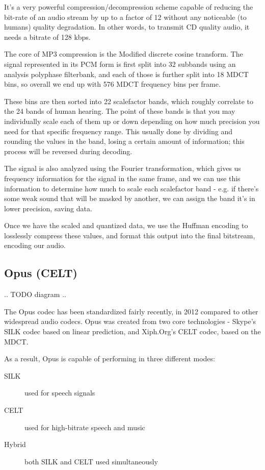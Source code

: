 It's a very powerful compression/decompression scheme capable of reducing the bit-rate of an audio stream by up to a factor of 12 without any noticeable (to humans) quality degradation. In other words, to transmit CD quality audio, it needs a bitrate of 128 kbps. \cite{Raissi2002TheTB}

The core of MP3 compression is the Modified discrete cosine transform. The signal represented in its PCM form is first split into 32 subbands using an analysis polyphase filterbank, and each of those is further split into 18 MDCT bins, so overall we end up with 576 MDCT frequency bins per frame.

These bins are then sorted into 22 scalefactor bands, which roughly correlate to the 24 bands of human hearing. The point of these bands is that you may individually scale each of them up or down depending on how much precision you need for that specific frequency range. This usually done by dividing and rounding the values in the band, losing a certain amount of information; this process will be reversed during decoding.

The signal is also analyzed using the Fourier transformation, which gives us frequency information for the signal in the same frame, and we can use this information to determine how much to scale each scalefactor band - e.g. if there's some weak sound that will be masked by another, we can assign the band it's in lower precision, saving data. \cite{wilburn_2007}

Once we have the scaled and quantized data, we use the Huffman encoding to losslessly compress these values, and format this output into the final bitstream, encoding our audio.

\subsection{Opus (CELT)}
.. TODO diagram ..

The Opus codec has been standardized fairly recently, in 2012 \cite{rfc6716} compared to other widespread audio codecs. Opus was created from two core technologies - Skype's SILK codec based on linear prediction, and Xiph.Org's CELT codec, based on the MDCT. \cite{opus_celt}

As a result, Opus is capable of performing in three different modes:

\begin{description}
	\item[SILK] used for speech signals
	\item[CELT] used for high-bitrate speech and music
	\item[Hybrid] both SILK and CELT used simultaneously
\end{description}


